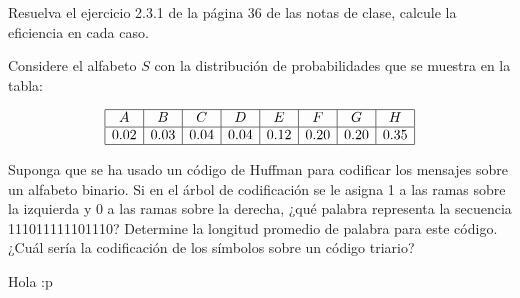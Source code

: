 
Resuelva el ejercicio 2.3.1 de la página 36 de las notas de clase, calcule la eficiencia en cada caso.

Considere el alfabeto $S$ con la distribución de probabilidades que se muestra en la tabla:

\[
\begin{array}{|c|c|c|c|c|c|c|c|}
\hline
A & B & C & D & E & F & G & H \\
\hline
0.02 & 0.03 & 0.04 & 0.04 & 0.12 & 0.20 & 0.20 & 0.35 \\
\hline
\end{array}
\]

Suponga que se ha usado un código de Huffman para codificar los mensajes sobre un alfabeto binario. Si en el árbol de codificación se le asigna 1 a las ramas sobre la izquierda y 0 a las ramas sobre la derecha, ¿qué palabra representa la secuencia 111011111101110? Determine la longitud promedio de palabra para este código. ¿Cuál sería la codificación de los símbolos sobre un código triario?


\begin{sol}
    Hola :p
\end{sol}